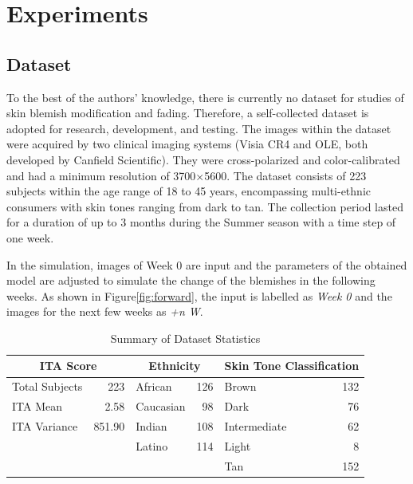 
\chapter{Experiments}
\begin{spacing}{1.5}
\setlength{\parskip}{0.3in}
\section{Dataset}
To the best of the authors' knowledge, there is currently no dataset for studies of skin blemish modification and fading. Therefore, a self-collected dataset is adopted for research, development, and testing. The images within the dataset were acquired by two clinical imaging systems (Visia CR4 and OLE, both developed by Canfield Scientific). They were cross-polarized and color-calibrated and had a minimum resolution of 3700$\times$5600. The dataset consists of 223 subjects within the age range of 18 to 45 years, encompassing multi-ethnic consumers with skin tones ranging from dark to tan. The collection period lasted for a duration of up to 3 months during the Summer season with a time step of one week.

In the simulation, images of Week 0 are input and the parameters of the obtained model are adjusted to simulate the change of the blemishes in the following weeks. As shown in Figure\ref{fig:forward}, the input is labelled as \textit{Week 0} and the images for the next few weeks as \textit{+n W}.
\begin{table}[t!]
    \caption{Summary of Dataset Statistics}
    \centering
    \begin{tabular}{lrlrlr}
        \toprule
        \multicolumn{2}{c}{\textbf{ITA Score}} & \multicolumn{2}{c}{\textbf{Ethnicity}} & \multicolumn{2}{c}{\textbf{Skin Tone Classification}} \\
        \midrule
        \midrule
        Total Subjects        & 223   & African       & 126 & Brown         & 132 \\
        ITA Mean              & 2.58  & Caucasian     & 98  & Dark          & 76  \\
        ITA Variance          & 851.90 & Indian       & 108 & Intermediate  & 62  \\
                              &       & Latino        & 114 & Light         & 8   \\
                              &       &               &     & Tan           & 152 \\
        \bottomrule
    \end{tabular}
    \label{tab:dataset_summary}
\end{table}


\end{spacing}
